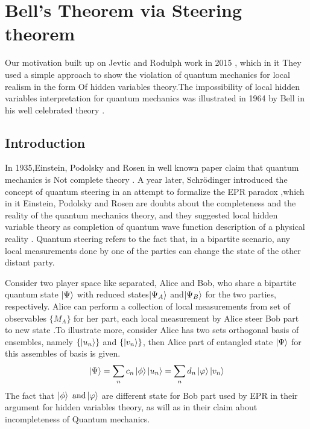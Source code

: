 \chapter{Bell's Theorem via Steering theorem}
Our motivation built up on Jevtic and  Rodulph work in 2015 \citep{Jevtic:2015:10.1364/JOSAB.32.000A50} , which in it They used a simple approach to show the violation of quantum mechanics for local realism in the form Of hidden variables theory.The impossibility of local hidden variables interpretation for quantum mechanics was illustrated in 1964 by Bell in his well celebrated theory \cite{bell1964einstein}.

\section{Introduction}\hfill \break
In 1935,Einstein, Podolsky and Rosen in well known paper claim that quantum  mechanics is Not complete theory \citep{EPR}.
A year later, Schrödinger introduced the concept of quantum steering in an attempt to formalize the EPR paradox \citep{schrodinger1935discussion},which in it Einstein, Podolsky and Rosen are doubts about the completeness and the reality of the quantum mechanics theory, and they suggested local hidden variable theory as completion of quantum wave function description of a physical reality \citep{EPR}. Quantum steering refers to the fact that, in a bipartite scenario, any local measurements  done by one of the parties can change the state of the other distant party.

Consider two player space like separated, Alice and Bob, who share a bipartite quantum state $\ket{\Psi}$ with reduced states$\ket{\Psi_A}$ and$\ket{\Psi_B}$ for the two parties, respectively. Alice can perform a collection of local measurements from set of observables $\{M_A\}$ for her part, each local measurement by Alice steer Bob part to new state \citep{book:474706}.To illustrate more, consider Alice has two sets orthogonal basis of ensembles, namely $\{\ket{u_n}\}$ and $\{\ket{v_n}\}$, then Alice part of entangled state $\ket{\Psi}$ for this assembles of basis is given.
\begin{equation}
\ket{\Psi}=\sum_n c_n \ket{\phi} \ket{u_n}=\sum_n d_n \ket{\varphi}\ket{v_n}
\end{equation}
The fact that $\ket{\phi} \text{ and} \ket{\varphi}$ are different state for Bob part used by EPR in their argument for hidden variables theory, as will as in their claim about incompleteness of Quantum mechanics.

